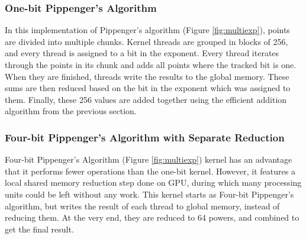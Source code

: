 \subsubsection{One-bit Pippenger's Algorithm}
In this implementation of Pippenger's algorithm (Figure \ref{fig:multiexp}), points are divided into multiple chunks. Kernel threads are grouped in blocks of 256, and every thread is assigned to a bit in the exponent. Every thread iterates through the points in its chunk and adds all points where the tracked bit is one. When they are finished, threads write the results to the global memory. These sums are then reduced based on the bit in the exponent which was assigned to them. Finally, these 256 values are added together using the efficient addition algorithm from the previous section.
\subsubsection{Four-bit Pippenger's Algorithm with Separate Reduction}
Four-bit Pippenger's Algorithm (Figure \ref{fig:multiexp}) kernel has an advantage that it performs fewer operations than the one-bit kernel. However, it features a local shared memory reduction step done on GPU, during which many processing units could be left without any work. This kernel starts as Four-bit Pippenger's algorithm, but writes the result of each thread to global memory, instead of reducing them. At the very end, they are reduced to 64 powers, and combined to get the final result.
